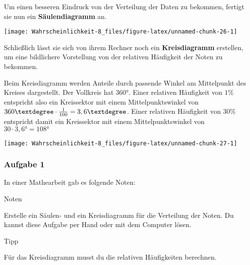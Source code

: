 \documentclass[
  ngerman,
]{book}
\begin{document}
Um einen besseren Eindruck von der Verteilung der Daten zu bekommen, fertigt sie nun ein \textbf{Säulendiagramm} an.

\begin{center}\texttt{[image: Wahrscheinlichkeit-8\_files/figure-latex/unnamed-chunk-26-1]} \end{center}

Schließlich lässt sie sich von ihrem Rechner noch ein \textbf{Kreisdiagramm} erstellen, um eine bildlichere Vorstellung von der relativen Häufigkeit der Noten zu bekommen.

Beim Kreisdiagramm werden Anteile durch passende Winkel am Mittelpunkt des Kreises dargestellt. Der Vollkreis hat 360°. Einer relativen Häufigkeit von \(1\%\) entspricht also ein Kreissektor mit einem Mittelpunktswinkel von \(360° \cdot {1 \over 100} = 3,6°\). Einer relativen Häufigkeit von \(30\%\) entspricht damit ein Kreissektor mit einem Mittelpunktswinkel von \(30 \cdot 3,6° = 108°\)

\begin{center}\texttt{[image: Wahrscheinlichkeit-8\_files/figure-latex/unnamed-chunk-27-1]} \end{center}

\hypertarget{section-12}{%
\subsubsection*{}\label{section-12}}

\hypertarget{aufgabe-1-2}{%
\subsubsection*{Aufgabe 1}\label{aufgabe-1-2}}

In einer Mathearbeit gab es folgende Noten:

Noten

Erstelle ein Säulen- und ein Kreisdiagramm für die Verteilung der Noten. Du kannst diese Aufgabe per Hand oder mit dem Computer lösen.

Tipp

Für das Kreisdiagramm musst du die relativen Häufigkeiten berechnen.

\hypertarget{section-13}{%
\subsubsection*{}\label{section-13}}
\end{document}
